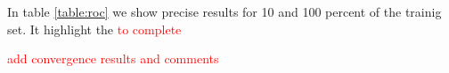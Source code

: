 \begin{table}
\centering
	
\label{table:roc}
\end{table}
In table \ref{table:roc} we show precise results for 10 and 100 percent of the trainig set. It highlight the \textcolor{red}{to complete}


\textcolor{red}{add convergence results and comments}









%
%

%	

%
%
%






